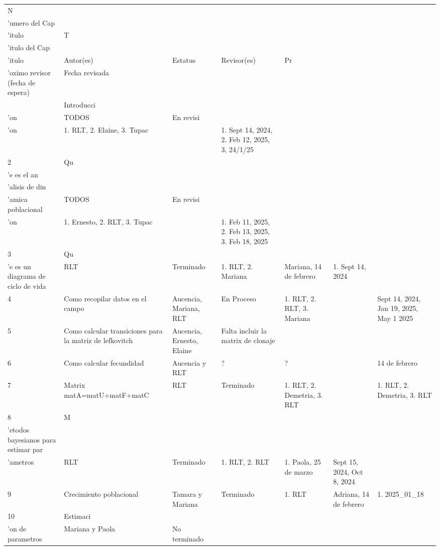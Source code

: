 \documentclass[
  12pt,
  letterpaper,
]{book}
\begin{document}
\begin{table}
\fontsize{12.0pt}{14.0pt}\selectfont
\begin{tabular*}{\linewidth}{@{\extracolsep{\fill}}lllllll}
\toprule
N\\'umero del Cap\\'itulo & T\\'itulo del Cap\\'itulo & Autor(es) & Estatus & Revisor(es) & Pr\\'oximo revisor (fecha de espera) & Fecha revisada \\ 
\midrule\addlinespace[2.5pt]
1 & Introducci\\'on & TODOS & En revisi\\'on & 1. RLT, 2. Elaine,  3. Tupac &   & 1. Sept 14, 2024, 2. Feb 12, 2025, 3, 24/1/25   \\ 
2 & Qu\\'e es el an\\'alisis de din\\'amica poblacional & TODOS & En revisi\\'on & 1. Ernesto, 2. RLT, 3. Tupac &  & 1. Feb 11, 2025, 2. Feb 13, 2025, 3. Feb 18, 2025  \\ 
3 & Qu\\'e es un diagrama de ciclo de vida & RLT & Terminado & 1. RLT, 2. Mariana & Mariana, 14 de febrero & 1. Sept 14, 2024 \\ 
4 & Como recopilar datos en el campo & Aucencia, Mariana, RLT & En Proceso & 1. RLT, 2. RLT, 3. Mariana &  & Sept 14, 2024, Jan 19, 2025, May 1 2025 \\ 
5 & Como calcular transiciones para la matriz de lefkovitch & Aucencia, Ernesto, Elaine & Falta incluir la matrix de clonaje   &  &  &  \\ 
6 & Como calcular fecundidad & Aucencia y RLT & ? & ? &  & 14 de febrero \\ 
7 & Matrix matA=matU+matF+matC & RLT & Terminado & 1. RLT, 2. Demetria, 3. RLT &  & 1. RLT, 2. Demetria, 3. RLT \\ 
8 & M\\'etodos bayesianos para estimar par\\'ametros & RLT & Terminado & 1. RLT, 2. RLT & 1. Paola, 25 de marzo & Sept 15, 2024, Oct 8, 2024 \\ 
9 & Crecimiento poblacional & Tamara y Mariana & Terminado & 1. RLT & Adriana, 14 de febrero & 1. 2025\_01\_18 \\ 
10 & Estimaci\\'on de parametros & Mariana y Paola & No terminado &  &  &  \\ 

\end{tabular*}
\end{table}
\end{document}
